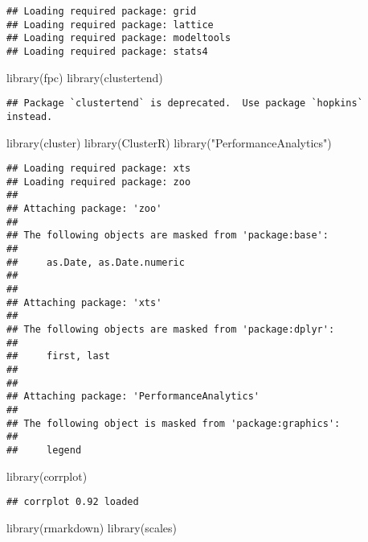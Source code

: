 \documentclass[
]{article}
\newenvironment{Shaded}{\begin{snugshade}}{\end{snugshade}}
\newcommand{\FunctionTok}[1]{\textcolor[rgb]{0.00,0.00,0.00}{#1}}
\newcommand{\NormalTok}[1]{#1}
\newcommand{\StringTok}[1]{\textcolor[rgb]{0.31,0.60,0.02}{#1}}
\begin{document}
\begin{verbatim}
## Loading required package: grid
## Loading required package: lattice
## Loading required package: modeltools
## Loading required package: stats4
\end{verbatim}

\begin{Shaded}
\begin{Highlighting}[]
\FunctionTok{library}\NormalTok{(fpc)}
\FunctionTok{library}\NormalTok{(clustertend)}
\end{Highlighting}
\end{Shaded}

\begin{verbatim}
## Package `clustertend` is deprecated.  Use package `hopkins` instead.
\end{verbatim}

\begin{Shaded}
\begin{Highlighting}[]
\FunctionTok{library}\NormalTok{(cluster)}
\FunctionTok{library}\NormalTok{(ClusterR)}
\FunctionTok{library}\NormalTok{(}\StringTok{"PerformanceAnalytics"}\NormalTok{)}
\end{Highlighting}
\end{Shaded}

\begin{verbatim}
## Loading required package: xts
## Loading required package: zoo
## 
## Attaching package: 'zoo'
## 
## The following objects are masked from 'package:base':
## 
##     as.Date, as.Date.numeric
## 
## 
## Attaching package: 'xts'
## 
## The following objects are masked from 'package:dplyr':
## 
##     first, last
## 
## 
## Attaching package: 'PerformanceAnalytics'
## 
## The following object is masked from 'package:graphics':
## 
##     legend
\end{verbatim}

\begin{Shaded}
\begin{Highlighting}[]
\FunctionTok{library}\NormalTok{(corrplot)}
\end{Highlighting}
\end{Shaded}

\begin{verbatim}
## corrplot 0.92 loaded
\end{verbatim}

\begin{Shaded}
\begin{Highlighting}[]
\FunctionTok{library}\NormalTok{(rmarkdown)}
\FunctionTok{library}\NormalTok{(scales)}
\end{Highlighting}
\end{Shaded}
\end{document}
